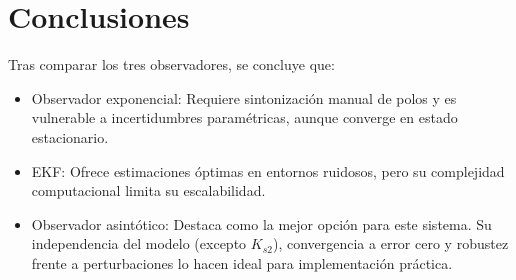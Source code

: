 \documentclass[letterpaper, 10 pt, conference]{ieeeconf}  %
\begin{document}
\section{Conclusiones}

Tras comparar los tres observadores, se concluye que:

\begin{itemize}
  \item{Observador exponencial: Requiere sintonización manual de polos y es vulnerable a incertidumbres paramétricas, aunque converge en estado estacionario.}
  \item{EKF: Ofrece estimaciones óptimas en entornos ruidosos, pero su complejidad computacional limita su escalabilidad.}
  \item{Observador asintótico: Destaca como la mejor opción para este sistema. Su independencia del modelo (excepto $K_{s2}$), convergencia a error cero y robustez frente a perturbaciones lo hacen ideal para implementación práctica.}
\end{itemize}
\end{document}
